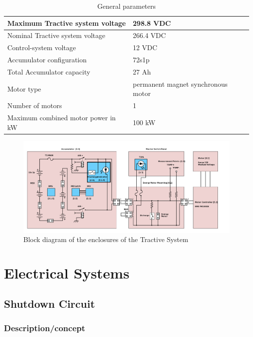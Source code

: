 \documentclass{article}
\begin{document}
	\begin{table}[H]
        \centering
        \begin{tabular}{|l|l|}
        \hline
            Maximum Tractive system voltage & 298.8 VDC \\ \hline
            Nominal Tractive system voltage & 266.4 VDC \\ \hline
            Control-system voltage & 12 VDC \\ \hline
            Accumulator configuration & 72s1p \\ \hline
            Total Accumulator capacity & 27 Ah \\ \hline
            Motor type & permanent magnet synchronous motor \\ \hline
            Number of motors & 1 \\ \hline
            Maximum combined motor power in kW & 100 kW \\ \hline
        \end{tabular}
        \caption{General parameters}
        \label{systemtable}
  \end{table}

  \begin{figure}[H]
  \centering
  \includegraphics[width = 0.9 \textwidth]{TS-Block-Diagram.png}
  \caption{Block diagram of the enclosures of the Tractive System}
  \label{fig:TS_block_diagram}
  \end{figure}


\section{Electrical Systems}\label{electrical_systems}

\subsection{Shutdown Circuit}\label{shutdown_circuit}

\subsubsection{Description/concept}
\end{document}
